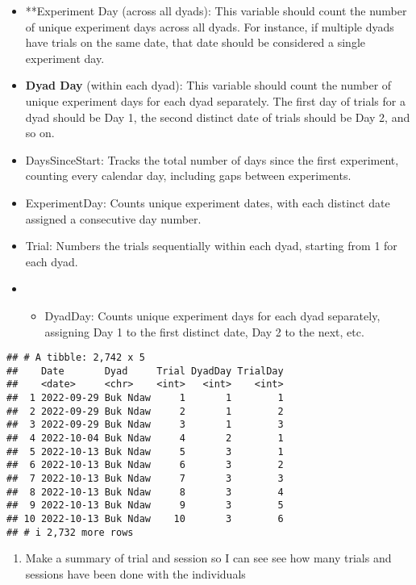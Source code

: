 \documentclass[
]{article}
\providecommand{\tightlist}{%
  \setlength{\itemsep}{0pt}\setlength{\parskip}{0pt}}
\begin{document}
\begin{itemize}
\item
  **Experiment Day (across all dyads): This variable should count the
  number of unique experiment days across all dyads. For instance, if
  multiple dyads have trials on the same date, that date should be
  considered a single experiment day.
\item
  \textbf{Dyad Day} (within each dyad): This variable should count the
  number of unique experiment days for each dyad separately. The first
  day of trials for a dyad should be Day 1, the second distinct date of
  trials should be Day 2, and so on.
\item
  DaysSinceStart: Tracks the total number of days since the first
  experiment, counting every calendar day, including gaps between
  experiments.
\item
  ExperimentDay: Counts unique experiment dates, with each distinct date
  assigned a consecutive day number.
\item
  Trial: Numbers the trials sequentially within each dyad, starting from
  1 for each dyad.
\item
  \begin{itemize}
  \tightlist
  \item
    DyadDay: Counts unique experiment days for each dyad separately,
    assigning Day 1 to the first distinct date, Day 2 to the next, etc.
  \end{itemize}
\end{itemize}

\begin{verbatim}
## # A tibble: 2,742 x 5
##    Date       Dyad     Trial DyadDay TrialDay
##    <date>     <chr>    <int>   <int>    <int>
##  1 2022-09-29 Buk Ndaw     1       1        1
##  2 2022-09-29 Buk Ndaw     2       1        2
##  3 2022-09-29 Buk Ndaw     3       1        3
##  4 2022-10-04 Buk Ndaw     4       2        1
##  5 2022-10-13 Buk Ndaw     5       3        1
##  6 2022-10-13 Buk Ndaw     6       3        2
##  7 2022-10-13 Buk Ndaw     7       3        3
##  8 2022-10-13 Buk Ndaw     8       3        4
##  9 2022-10-13 Buk Ndaw     9       3        5
## 10 2022-10-13 Buk Ndaw    10       3        6
## # i 2,732 more rows
\end{verbatim}

\begin{enumerate}
\def\labelenumi{\arabic{enumi}.}
\setcounter{enumi}{3}
\tightlist
\item
  Make a summary of trial and session so I can see see how many trials
  and sessions have been done with the individuals
\end{enumerate}
\end{document}
